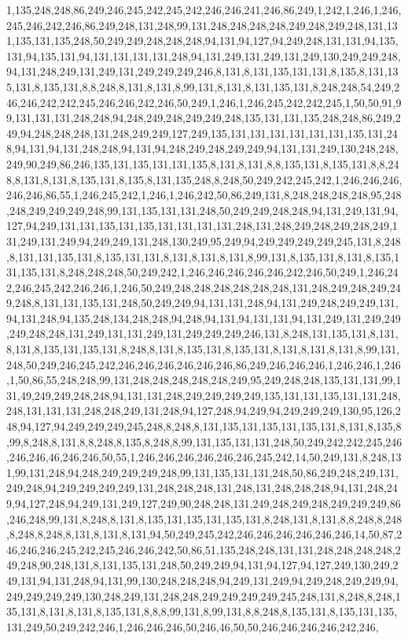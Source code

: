 1,135,248,248,86,249,246,245,242,245,242,246,246,241,246,86,249,1,242,1,246,1,246,245,246,242,246,86,249,248,131,248,99,131,248,248,248,248,249,248,249,248,131,131,135,131,135,248,50,249,249,248,248,248,94,131,94,127,94,249,248,131,131,94,135,131,94,135,131,94,131,131,131,131,248,94,131,249,131,249,131,249,130,249,249,248,94,131,248,249,131,249,131,249,249,249,246,8,131,8,131,135,131,131,8,135,8,131,135,131,8,135,131,8,8,248,8,131,8,131,8,99,131,8,131,8,131,135,131,8,248,248,54,249,246,246,242,242,245,246,246,242,246,50,249,1,246,1,246,245,242,242,245,1,50,50,91,99,131,131,131,248,248,94,248,249,248,249,249,248,135,131,131,135,248,248,86,249,249,94,248,248,248,131,248,249,249,127,249,135,131,131,131,131,131,131,135,131,248,94,131,94,131,248,248,94,131,94,248,249,248,249,249,94,131,131,249,130,248,248,249,90,249,86,246,135,131,135,131,131,135,8,131,8,131,8,8,135,131,8,135,131,8,8,248,8,131,8,131,8,135,131,8,135,8,131,135,248,8,248,50,249,242,245,242,1,246,246,246,246,246,86,55,1,246,245,242,1,246,1,246,242,50,86,249,131,8,248,248,248,248,95,248,248,249,249,249,248,99,131,135,131,131,248,50,249,249,248,248,94,131,249,131,94,127,94,249,131,131,135,131,135,131,131,131,131,248,131,248,249,248,249,248,249,131,249,131,249,94,249,249,131,248,130,249,95,249,94,249,249,249,249,245,131,8,248,8,131,131,135,131,8,135,131,131,8,131,8,131,8,131,8,99,131,8,135,131,8,131,8,135,131,135,131,8,248,248,248,50,249,242,1,246,246,246,246,246,242,246,50,249,1,246,242,246,245,242,246,246,1,246,50,249,248,248,248,248,248,248,131,248,249,248,249,249,248,8,131,131,135,131,248,50,249,249,94,131,131,248,94,131,249,248,249,249,131,94,131,248,94,135,248,134,248,248,94,248,94,131,94,131,131,94,131,249,131,249,249,249,248,248,131,249,131,131,249,131,249,249,249,246,131,8,248,131,135,131,8,131,8,131,8,135,131,135,131,8,248,8,131,8,135,131,8,135,131,8,131,8,131,8,131,8,99,131,248,50,249,246,245,242,246,246,246,246,246,246,86,249,246,246,246,1,246,246,1,246,1,50,86,55,248,248,99,131,248,248,248,248,248,249,95,249,248,248,135,131,131,99,131,49,249,249,248,248,94,131,131,248,249,249,249,249,135,131,131,135,131,131,248,248,131,131,131,248,248,249,131,248,94,127,248,94,249,94,249,249,249,130,95,126,248,94,127,94,249,249,249,245,248,8,248,8,131,135,131,135,131,135,131,8,131,8,135,8,99,8,248,8,131,8,8,248,8,135,8,248,8,99,131,135,131,131,248,50,249,242,242,245,246,246,246,46,246,246,50,55,1,246,246,246,246,246,246,245,242,14,50,249,131,8,248,131,99,131,248,94,248,249,249,249,248,99,131,135,131,131,248,50,86,249,248,249,131,249,248,94,249,249,249,249,131,248,248,248,131,248,131,248,248,248,94,131,248,249,94,127,248,94,249,131,249,127,249,90,248,248,131,249,248,249,248,249,249,249,86,246,248,99,131,8,248,8,131,8,135,131,135,131,135,131,8,248,131,8,131,8,8,248,8,248,8,248,8,248,8,131,8,131,8,131,94,50,249,245,242,246,246,246,246,246,246,14,50,87,246,246,246,245,242,245,246,246,242,50,86,51,135,248,248,131,131,248,248,248,248,249,248,90,248,131,8,131,135,131,248,50,249,249,94,131,94,127,94,127,249,130,249,249,131,94,131,248,94,131,99,130,248,248,248,94,249,131,249,94,249,248,249,249,94,249,249,249,249,130,248,249,131,248,248,249,249,249,249,245,248,131,8,248,8,248,135,131,8,131,8,131,8,135,131,8,8,8,99,131,8,99,131,8,8,248,8,135,131,8,135,131,135,131,249,50,249,242,246,1,246,246,246,50,246,46,50,50,246,246,246,246,242,246,